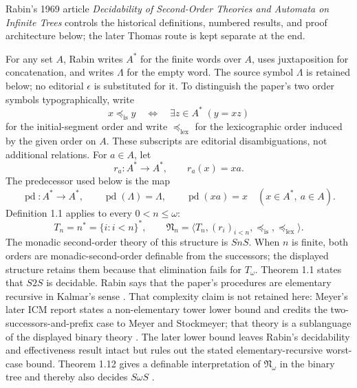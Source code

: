 Rabin's 1969 article \emph{Decidability of Second-Order Theories and Automata
on Infinite Trees} controls the historical definitions, numbered results, and
proof architecture below; the later Thomas route is kept separate at the end.

For any set \(A\), Rabin writes \(A^*\) for the finite words over \(A\), uses
juxtaposition for concatenation, and writes \(\Lambda\) for the empty word.
The source symbol \(\Lambda\) is retained below; no editorial
\(\epsilon\) is substituted for it.
To distinguish the paper's two order symbols typographically, write
\[
 x\preccurlyeq_{\mathrm{is}}y
   \quad\Longleftrightarrow\quad
   \exists z\in A^*\;(y=xz)
\]
for the initial-segment order and write
\(\preccurlyeq_{\mathrm{lex}}\) for the lexicographic order induced by the
given order on \(A\).  These subscripts are editorial disambiguations, not
additional relations.  For \(a\in A\), let
\[
 r_a:A^*\longrightarrow A^*,
 \qquad r_a(x)=xa.
\]
The predecessor used below is the map
\[
 \operatorname{pd}:A^*\longrightarrow A^*,
 \qquad
 \operatorname{pd}(\Lambda)=\Lambda,
 \qquad
 \operatorname{pd}(xa)=x
 \quad(x\in A^*,\ a\in A).
\]
Definition 1.1 applies to every \(0<n\leq\omega\):
\[
 T_n=n^*=\{i:i<n\}^*,
 \qquad
 \mathfrak N_n
  =\bigl\langle T_n,(r_i)_{i<n},
      \preccurlyeq_{\mathrm{is}},\preccurlyeq_{\mathrm{lex}}\bigr\rangle.
\]
The monadic second-order theory of this structure is \(SnS\).  When \(n\) is
finite, both orders are monadic-second-order definable from the successors;
the displayed structure retains them because that elimination fails for
\(T_\omega\).  Theorem 1.1 states that \(S2S\) is decidable.  Rabin says that
the paper's procedures are elementary recursive in Kalmar's sense
\cite[pp.~1, 4]{Rabin1969}.  That complexity claim is not retained here:
Meyer's later ICM report states a non-elementary tower lower bound and credits
the two-successors-and-prefix case to Meyer and Stockmeyer; that theory is a
sublanguage of the displayed binary theory
\cite[pp.~478--479]{Meyer1975Complexity}.  The later lower bound leaves Rabin's
decidability and effectiveness result intact but rules out the stated
elementary-recursive worst-case bound.  Theorem 1.12 gives a definable
interpretation of \(\mathfrak N_\omega\) in the binary tree and thereby also
decides \(S\omega S\)
\cite[pp.~3--5, 10--11]{Rabin1969}.

